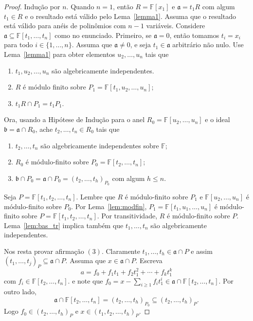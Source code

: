 \documentclass[12pt]{amsart}
\renewcommand{\a}{\mathfrak a}
\renewcommand{\b}{\mathfrak b}
\newcommand{\F}{\mathbb F}
\begin{document}
\begin{proof}
    Indução por $n$. Quando $n=1$, então $R=\F[x_1]$ e $\a=t_1R$ com algum $t_1\in R$ e o resultado está válido 
    pelo Lema~\ref{lemma1}. Assuma que o resultado está válido para anéis de polinômios com $n-1$ variáveis. 
    Considere $\a\subseteq \F[t_1,\ldots,t_n]$ como no enunciado. Primeiro, se $\a=0$, então 
    tomamos $t_i=x_i$ para todo $i\in\{1,\ldots,n\}$. Assuma que $\a\neq 0$, e seja $t_1\in\a$ arbitrário 
    não nulo. Use Lema~\ref{lemma1} para obter elementos $u_2,\ldots,u_n$ tais que 
    \begin{enumerate}
        \item $t_1,u_2,\ldots,u_n$ são algebricamente independentes.
        \item $R$ é módulo finito sobre $P_1=\F[t_1,u_2,\ldots,u_n]$;
        \item $t_1R\cap P_1=t_1P_1$. 
    \end{enumerate}
    Ora, usando a Hipótese de Indução para o anel $R_0=\F[u_2,\ldots,u_n]$ e o ideal $\b=\a\cap R_0$, ache 
    $t_2,\ldots,t_n\in R_0$ tais que 
    \begin{enumerate}
        \item  $t_2,\ldots,t_n$ são algebricamente independentes sobre $\F$;
        \item $R_0$ é módulo-finito sobre $P_0=\F[t_2,\ldots,t_n]$;
        \item $\b\cap P_0=\a\cap P_0=(t_2,\ldots,t_h)_{P_0}$ com algum $h\leq n$.
    \end{enumerate} 
    Seja $P=\F[t_1,t_2,\ldots,t_n]$.
    Lembre que $R$ é módulo-finito sobre $P_1$ e $\F[u_2,\ldots,u_n]$ é módulo-finito sobre
    $P_0$. Por Lema~\ref{lem:modfin}, $P_1=\F[t_1,u_1,\ldots,u_n]$ é módulo-finito sobre 
    $P=\F[t_1,t_2,\ldots,t_n]$. Por transitividade, $R$ é módulo-finito sobre $P$. Lema~\ref{lem:bas_tr} implica 
    também que $t_1,\ldots,t_n$ são algebricamente independentes. 

    Nos resta provar afirmação $(3)$. Claramente $t_1,\ldots,t_h\in \a\cap P$ e assim 
    $(t_1,\ldots,t_j)_{P}\subseteq \a\cap P$. Assuma que $x\in\a\cap P$. Escreva 
    \[
        a=f_0+f_1t_1+f_2t_1^2+\cdots +f_kt_1^k
    \]
    com $f_i\in\F[t_2,\ldots,t_n]$.
    e note que $f_0=x-\sum_{i\geq 1}f_it_1^i\in \a\cap \F[t_2,\ldots,t_n]$. Por outro lado,
    \[
        \a\cap \F[t_2,\ldots,t_n]=(t_2,\ldots,t_h)_{P_0}\subseteq (t_2,\ldots,t_h)_{P}. 
    \] 
    Logo $f_0\in (t_2,\ldots,t_h)_{P}$ e $x\in (t_1,t_2,\ldots,t_h)_{P}$.
\end{proof}
\end{document}
